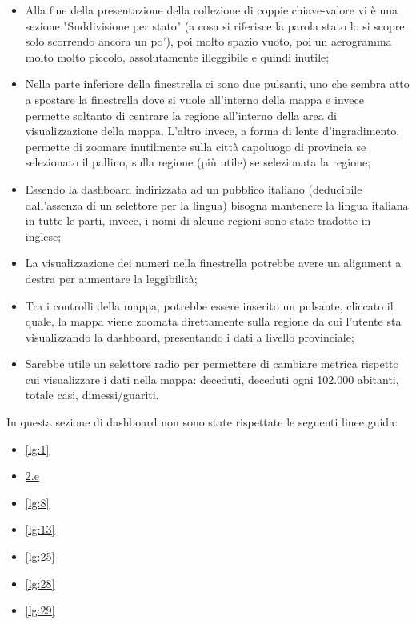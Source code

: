 \begin{itemize}
    \item Alla fine della presentazione della collezione di coppie chiave-valore vi è una sezione "Suddivisione per stato" (a cosa si riferisce la parola stato lo si scopre solo scorrendo ancora un po'), poi molto spazio vuoto, poi un aerogramma molto molto piccolo, assolutamente illeggibile e quindi inutile;
    \item Nella parte inferiore della finestrella ci sono due pulsanti, uno che sembra atto a spostare la finestrella dove si vuole all'interno della mappa e invece permette soltanto di centrare la regione all'interno della area di visualizzazione della mappa. L'altro invece, a forma di lente d'ingradimento, permette di zoomare inutilmente sulla città capoluogo di provincia se selezionato il pallino, sulla regione (più utile) se selezionata la regione;
    \item Essendo la dashboard indirizzata ad un pubblico italiano (deducibile dall'assenza di un selettore per la lingua) bisogna mantenere la lingua italiana in tutte le parti, invece, i nomi di alcune regioni sono state tradotte in inglese;
    \item La visualizzazione dei numeri nella finestrella potrebbe avere un alignment a destra per aumentare la leggibilità;
    \item Tra i controlli della mappa, potrebbe essere inserito un pulsante, cliccato il quale, la mappa viene zoomata direttamente sulla regione da cui l'utente sta visualizzando la dashboard, presentando i dati a livello provinciale;
    \item Sarebbe utile un selettore radio per permettere di cambiare metrica rispetto cui visualizzare i dati nella mappa: deceduti, deceduti ogni 102.000 abitanti, totale casi, dimessi/guariti.
\end{itemize}
In questa sezione di dashboard non sono state rispettate le seguenti linee guida:
\begin{itemize}
    \item \ref{lg:1}
    \item \hyperref[lg:2.e]{2.e}
    \item \ref{lg:8}
    \item \ref{lg:13}
    \item \ref{lg:25}
    \item \ref{lg:28}
    \item \ref{lg:29}
\end{itemize}

